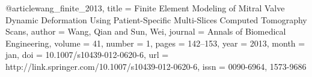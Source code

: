 @article{wang_finite_2013,
  title = {Finite Element Modeling of Mitral Valve Dynamic Deformation Using Patient-Specific Multi-Slices Computed Tomography Scans},
  author = {Wang, Qian and Sun, Wei},
  journal = {Annals of Biomedical Engineering},
  volume = {41},
  number = {1},
  pages = {142--153},
  year = {2013},
  month = {jan},
  doi = {10.1007/s10439-012-0620-6},
  url = {http://link.springer.com/10.1007/s10439-012-0620-6},
  issn = {0090-6964, 1573-9686}
}
